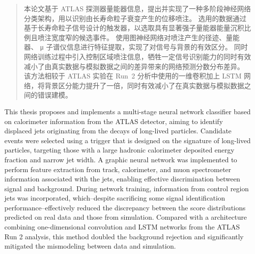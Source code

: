 

\begin{abstract}
  本论文基于 ATLAS 探测器量能器信息，提出并实现了一种多阶段神经网络分类架构，用以识别由长寿命粒子衰变产生的位移喷注。
  选用的数据通过基于长寿命粒子信号设计的触发器，以选取具有显著强子量能器能量沉积比例且喷注宽度窄的候选事件。
  使用图神经网络对喷注产生的径迹、量能器、 μ 子谱仪信息进行特征提取，实现了对信号与背景的有效区分。
  同时网络训练过程中引入控制区域喷注信息，牺牲一定信号识别能力的同时有效减小了由真实数据与模拟数据之间的差异带来的网络预测分数分布差异。
  该方法相较于 ATLAS 实验在 Run~2 分析中使用的一维卷积加上 LSTM 网络，将背景区分能力提升了一倍，同时有效减小了在真实数据与模拟数据之间的错误建模。
\end{abstract}

\begin{abstract*}
  This thesis proposes and implements a multi-stage neural network classifier based on calorimeter information from the ATLAS detector,
  aiming to identify displaced jets originating from the decays of long-lived particles.
  Candidate events were selected using a trigger that is designed on the signature of long-lived particles,
  targeting those with a large hadronic calorimeter deposited energy fraction and narrow jet width.
  A graphic neural network was implemented to perform feature extraction from track, calorimeter,
  and muon spectrometer information associated with the jets, enabling effective discrimination between signal and background.
  During network training, information from control region jets was incorporated,
  which--despite sacrificing some signal identification performance--effectively reduced the discrepancy
  between the score distributions predicted on real data and those from simulation.
  Compared with a architecture combining one-dimensional convolution and LSTM networks from the ATLAS Run 2 analysis,
  this method doubled the background rejection and significantly mitigated the mismodeling between data and simulation.
\end{abstract*}
